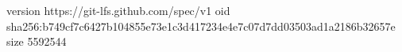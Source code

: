 version https://git-lfs.github.com/spec/v1
oid sha256:b749cf7c6427b104855e73e1c3d417234e4e7c07d7dd03503ad1a2186b32657e
size 5592544
